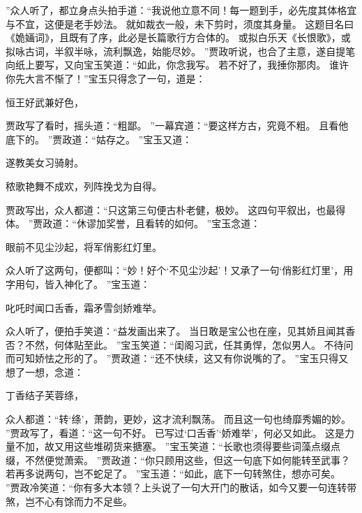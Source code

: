 ”众人听了，都立身点头拍手道：“我说他立意不同！每一题到手，必先度其体格宜与不宜，这便是老手妙法。
就如裁衣一般，未下剪时，须度其身量。
这题目名曰《姽婳词》，且既有了序，此必是长篇歌行方合体的。
或拟白乐天《长恨歌》，或拟咏古词，半叙半咏，流利飘逸，始能尽妙。
”贾政听说，也合了主意，遂自提笔向纸上要写，又向宝玉笑道：“如此，你念我写。
若不好了，我捶你那肉。
谁许你先大言不惭了！”宝玉只得念了一句，道是：\par
\hop
恒王好武兼好色，\par
\hop
贾政写了看时，摇头道：“粗鄙。
”一幕宾道：“要这样方古，究竟不粗。
且看他底下的。
”贾政道：“姑存之。
”宝玉又道：\par
\hop
遂教美女习骑射。
\par
秾歌艳舞不成欢，列阵挽戈为自得。
\par
\hop
贾政写出，众人都道：“只这第三句便古朴老健，极妙。
这四句平叙出，也最得体。
”贾政道：“休谬加奖誉，且看转的如何。
”宝玉念道：\par
\hop
眼前不见尘沙起，将军俏影红灯里。
\par
\hop
众人听了这两句，便都叫：“妙！好个‘不见尘沙起’！又承了一句‘俏影红灯里’，用字用句，皆入神化了。
”宝玉道：\par
\hop
叱吒时闻口舌香，霜矛雪剑娇难举。
\par
\hop
众人听了，便拍手笑道：“益发画出来了。
当日敢是宝公也在座，见其娇且闻其香否？不然，何体贴至此。
”宝玉笑道：“闺阁习武，任其勇悍，怎似男人。
不待问而可知娇怯之形的了。
”贾政道：“还不快续，这又有你说嘴的了。
”宝玉只得又想了一想，念道：\par
\hop
丁香结子芙蓉绦，\par
\hop
众人都道：“转‘绦’，萧韵，更妙，这才流利飘荡。
而且这一句也绮靡秀媚的妙。
”贾政写了，看道：“这一句不好。
已写过‘口舌香’‘娇难举’，何必又如此。
这是力量不加，故又用这些堆砌货来搪塞。
”宝玉笑道：“长歌也须得要些词藻点缀点缀，不然便觉萧索。
”贾政道：“你只顾用这些，但这一句底下如何能转至武事？若再多说两句，岂不蛇足了。
”宝玉道：“如此，底下一句转煞住，想亦可矣。
”贾政冷笑道：“你有多大本领？上头说了一句大开门的散话，如今又要一句连转带煞，岂不心有馀而力不足些。
